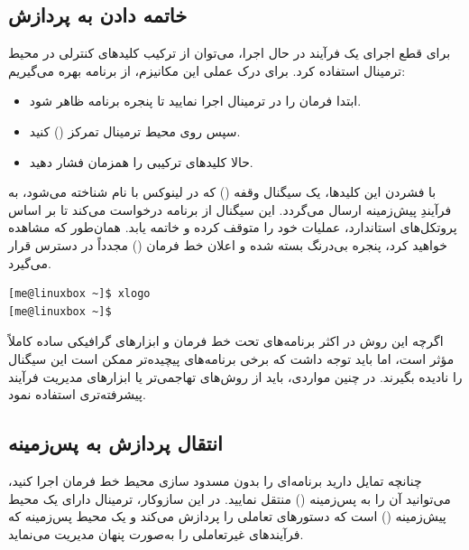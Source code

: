 
\subsection{خاتمه دادن به پردازش}

برای قطع اجرای یک فرآیند در حال اجرا، می‌توان از ترکیب کلیدهای کنترلی در محیط ترمینال استفاده کرد. برای درک عملی این مکانیزم، از برنامه  بهره می‌گیریم:

\begin{itemize}
  \item ابتدا فرمان  را در ترمینال اجرا نمایید تا پنجره برنامه ظاهر شود.
  \item سپس روی محیط ترمینال تمرکز () کنید.
  \item حالا کلیدهای ترکیبی  را همزمان فشار دهید.
\end{itemize}

با فشردن این کلیدها، یک سیگنال وقفه () که در لینوکس با نام  شناخته می‌شود، به فرآیندِ پیش‌زمینه ارسال می‌گردد. این سیگنال از برنامه درخواست می‌کند تا بر اساس پروتکل‌های استاندارد، عملیات خود را متوقف کرده و خاتمه یابد. همان‌طور که مشاهده خواهید کرد، پنجره  بی‌درنگ بسته شده و اعلان خط فرمان () مجدداً در دسترس قرار می‌گیرد.

\begin{latin}
\begin{lstlisting}
[me@linuxbox ~]$ xlogo
[me@linuxbox ~]$
\end{lstlisting}
\end{latin}

اگرچه این روش در اکثر برنامه‌های تحت خط فرمان و ابزارهای گرافیکی ساده کاملاً مؤثر است، اما باید توجه داشت که برخی برنامه‌های پیچیده‌تر ممکن است این سیگنال را نادیده بگیرند. در چنین مواردی، باید از روش‌های تهاجمی‌تر یا ابزارهای مدیریت فرآیند پیشرفته‌تری استفاده نمود.

\subsection{انتقال پردازش به پس‌زمینه}

چنانچه تمایل دارید برنامه‌ای را بدون مسدود سازی محیط خط فرمان اجرا کنید، می‌توانید آن را به پس‌زمینه () منتقل نمایید. در این سازوکار، ترمینال دارای یک محیط پیش‌زمینه () است که دستورهای تعاملی را پردازش می‌کند و یک محیط پس‌زمینه که فرآیندهای غیرتعاملی را به‌صورت پنهان مدیریت می‌نماید.

